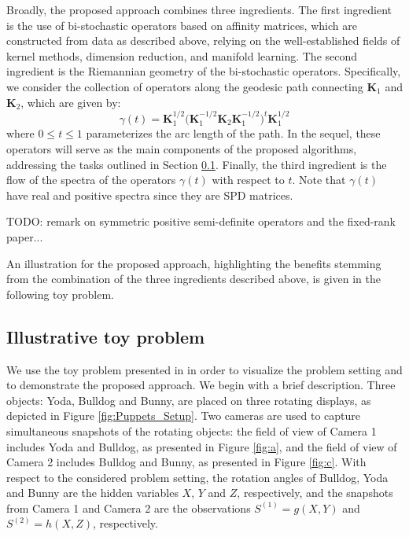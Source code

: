\documentclass[]{article}
\theoremstyle{definition}
\begin{document}
Broadly, the proposed approach combines three ingredients. 
The first ingredient is the use of bi-stochastic operators based on affinity matrices, which are constructed from data as described above, relying on the well-established fields of kernel methods, dimension reduction, and manifold learning.
%
The second ingredient is the Riemannian geometry of the bi-stochastic operators. Specifically, we consider the collection of operators along the geodesic path connecting $\mathbf{K}_1$ and $\mathbf{K}_2$, which are given by:
\begin{equation}
	\gamma(t)= \mathbf{K}_1^{1/2}\big( \mathbf{K}_1^{-1/2}\mathbf{K}_2\mathbf{K}_1^{-1/2} )^t \mathbf{K}_1^{1/2}
\end{equation}
where $0\leq t \leq1$ parameterizes the arc length of the path. In the sequel, these operators will serve as the main components 
of the proposed algorithms, addressing the tasks outlined in Section \ref{sec:ToyProblem}.
%
Finally, the third ingredient is the flow of the spectra of the operators $\gamma(t)$ with respect to $t$. Note that $\gamma(t)$ have real and positive spectra since they are SPD matrices.

TODO: remark on symmetric positive semi-definite operators and the fixed-rank paper...

An illustration for the proposed approach, highlighting the benefits stemming from the combination of the three ingredients described above, is given in the following toy problem.
		
\subsection{Illustrative toy problem}
\label{sec:ToyProblem}
We use the toy problem presented in \cite{lederman2018learning} in order to visualize the problem setting and to demonstrate the proposed approach. We begin with a brief description.
%
Three objects: Yoda, Bulldog and Bunny, are placed on three rotating displays, as depicted in Figure \ref{fig:Puppets_Setup}. Two cameras are used to capture simultaneous snapshots of the rotating objects: the field of view of Camera 1 includes Yoda and Bulldog, as presented in Figure \ref{fig:a}, and the field of view of Camera 2 includes Bulldog and Bunny, as presented in Figure \ref{fig:c}.
%	
With respect to the considered problem setting, the rotation angles of Bulldog, Yoda and Bunny are the hidden variables $X$, $Y$ and $Z$, respectively, and the snapshots from Camera 1 and Camera 2 are the observations $S^{(1)} = g(X,Y)$ and $S^{(2)} = h(X,Z)$, respectively. 
\end{document}
